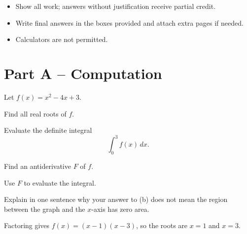 \worksheetheader

\begin{instructions}
  \begin{itemize}
    \item Show all work; answers without justification receive partial credit.
    \item Write final answers in the boxes provided and attach extra pages if needed.
    \item Calculators are not permitted.
  \end{itemize}
\end{instructions}

\section*{Part A -- Computation}

Let $f(x) = x^{2} - 4x + 3$.
\begin{parts}
  \item Find all real roots of $f$.
  \item Evaluate the definite integral
    \[
      \int_{0}^{3} f(x)\,dx.
    \]
    \begin{parts}
      \item Find an antiderivative $F$ of $f$.
      \item Use $F$ to evaluate the integral.
    \end{parts}
  \item Explain in one sentence why your answer to (b) does not mean the region
    between the graph and the $x$-axis has zero area.
\end{parts}

\begin{solution}[Solution to (a)]
  Factoring gives $f(x) = (x-1)(x-3)$, so the roots are $x = 1$ and $x = 3$.
\end{solution}

\begin{answer}[3.5cm]
\end{answer}

